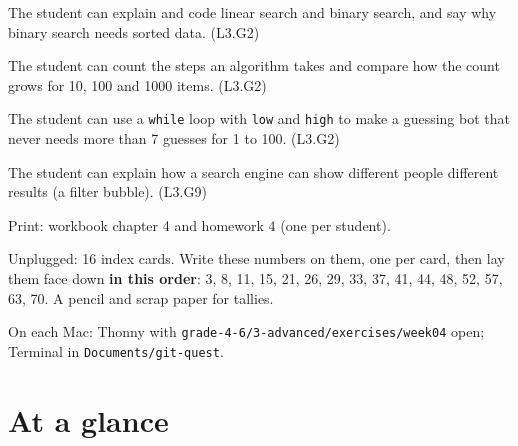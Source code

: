 
\begin{objectives}
  \item The student can explain and code linear search and binary search, and say why binary search needs sorted data. (L3.G2)
  \item The student can count the steps an algorithm takes and compare how the count grows for 10, 100 and 1000 items. (L3.G2)
  \item The student can use a \texttt{while} loop with \texttt{low} and \texttt{high} to make a guessing bot that never needs more than 7 guesses for 1 to 100. (L3.G2)
  \item The student can explain how a search engine can show different people different results (a filter bubble). (L3.G9)
\end{objectives}

\begin{materials}
  \item Print: workbook chapter 4 and homework 4 (one per student).
  \item Unplugged: 16 index cards. Write these numbers on them, one per card, then lay them face down \textbf{in this order}: 3, 8, 11, 15, 21, 26, 29, 33, 37, 41, 44, 48, 52, 57, 63, 70. A pencil and scrap paper for tallies.
  \item On each Mac: Thonny with \texttt{grade-4-6/3-advanced/exercises/week04} open; Terminal in \texttt{Documents/git-quest}.
\end{materials}

\section{At a glance}
\begin{timeplan}
\end{timeplan}

